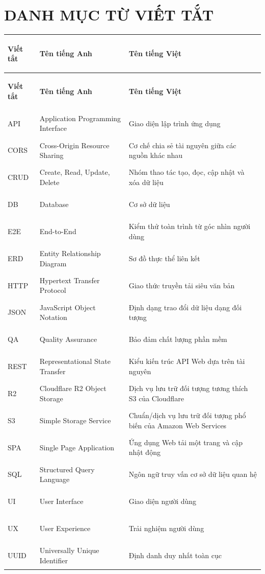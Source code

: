 \chapter*{DANH MỤC TỪ VIẾT TẮT}

\begingroup\small
\begin{longtable}{|>{\bfseries\raggedright\arraybackslash}p{}|>{\raggedright\arraybackslash}p{}|>{\raggedright\arraybackslash}p{}|}
\hline
\rowcolor{black!7}\textbf{Viết tắt} & \textbf{Tên tiếng Anh} & \textbf{Tên tiếng Việt} \\
\hline
\endfirsthead
\hline
\rowcolor{black!7}\textbf{Viết tắt} & \textbf{Tên tiếng Anh} & \textbf{Tên tiếng Việt} \\
\hline
\endhead
API & Application Programming Interface & Giao diện lập trình ứng dụng \\
\hline
CORS & Cross-Origin Resource Sharing & Cơ chế chia sẻ tài nguyên giữa các nguồn khác nhau \\
\hline
CRUD & Create, Read, Update, Delete & Nhóm thao tác tạo, đọc, cập nhật và xóa dữ liệu \\
\hline
DB & Database & Cơ sở dữ liệu \\
\hline
E2E & End-to-End & Kiểm thử toàn trình từ góc nhìn người dùng \\
\hline
ERD & Entity Relationship Diagram & Sơ đồ thực thể liên kết \\
\hline
HTTP & Hypertext Transfer Protocol & Giao thức truyền tải siêu văn bản \\
\hline
JSON & JavaScript Object Notation & Định dạng trao đổi dữ liệu dạng đối tượng \\
\hline
QA & Quality Assurance & Bảo đảm chất lượng phần mềm \\
\hline
REST & Representational State Transfer & Kiểu kiến trúc API Web dựa trên tài nguyên \\
\hline
R2 & Cloudflare R2 Object Storage & Dịch vụ lưu trữ đối tượng tương thích S3 của Cloudflare \\
\hline
S3 & Simple Storage Service & Chuẩn/dịch vụ lưu trữ đối tượng phổ biến của Amazon Web Services \\
\hline
SPA & Single Page Application & Ứng dụng Web tải một trang và cập nhật động \\
\hline
SQL & Structured Query Language & Ngôn ngữ truy vấn cơ sở dữ liệu quan hệ \\
\hline
UI & User Interface & Giao diện người dùng \\
\hline
UX & User Experience & Trải nghiệm người dùng \\
\hline
UUID & Universally Unique Identifier & Định danh duy nhất toàn cục \\
\hline
\end{longtable}
\endgroup
